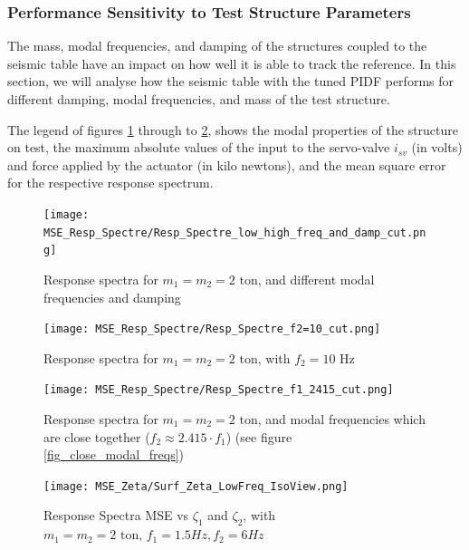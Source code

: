\documentclass[9pt]{extarticle}
\begin{document}
\subsubsection{Performance Sensitivity to Test Structure Parameters}%

The mass, modal frequencies, and damping of the structures coupled to the seismic table have an impact on how well it is able to track the reference. In this section, we will analyse how the seismic table with the tuned PIDF performs for different damping, modal frequencies, and mass of the test structure. 

The legend of figures \ref{Resp_Spectre_low_high_freq_and_damp} through to \ref{Resp_Spectre_f1_2415}, shows the modal properties of the structure on test, the maximum absolute values of the input to the servo-valve $i_{sv}$ (in volts) and force applied by the actuator (in kilo newtons), and the mean square error for the respective response spectrum.

\begin{figure}[H]
    \centering
    \texttt{[image: MSE\_Resp\_Spectre/Resp\_Spectre\_low\_high\_freq\_and\_damp\_cut.png]}
    \caption{Response spectra for $m_1=m_2=2 \text{ ton}$, and different modal frequencies and damping}
    \label{Resp_Spectre_low_high_freq_and_damp}
\end{figure}

\begin{figure}[H]
    \centering
    \texttt{[image: MSE\_Resp\_Spectre/Resp\_Spectre\_f2=10\_cut.png]}
    \caption{Response spectra for $m_1=m_2=2\text{ ton}$, with $f_2=10$ Hz}
\end{figure}

\begin{figure}[H]
    \centering
    \texttt{[image: MSE\_Resp\_Spectre/Resp\_Spectre\_f1\_2415\_cut.png]}
    \caption{Response spectra for $m_1=m_2=2\text{ ton}$, and modal frequencies which are close together ($f_2 \approx2.415\cdot f_1$) (see figure \ref{fig_close_modal_freqs})}
    \label{Resp_Spectre_f1_2415}
\end{figure}



\begin{figure}[H]
    \centering
    \texttt{[image: MSE\_Zeta/Surf\_Zeta\_LowFreq\_IsoView.png]}
    \caption{Response Spectra MSE vs $\zeta_1$ and $\zeta_2$, with $m_1=m_2=2\text{ ton, }f_1=1.5 Hz, f_2=6 Hz$}
\end{figure}
\end{document}
